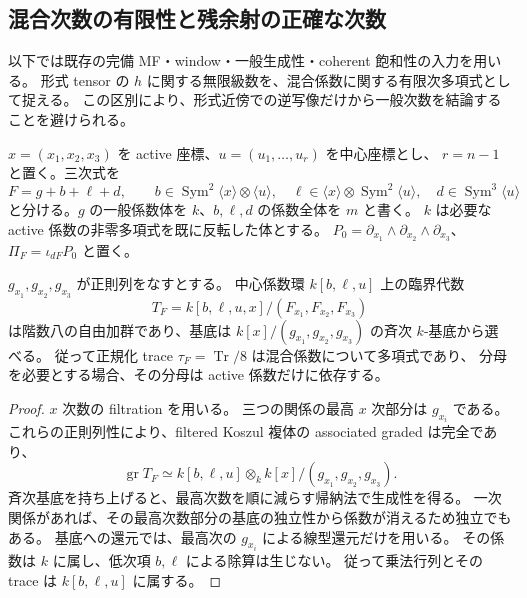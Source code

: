 \subsection{混合次数の有限性と残余射の正確な次数}

以下では既存の完備 MF・window・一般生成性・coherent 飽和性の入力を用いる。
形式 tensor の $h$ に関する無限級数を、混合係数に関する有限次多項式として捉える。
この区別により、形式近傍での逆写像だけから一般次数を結論することを避けられる。

$x=(x_1,x_2,x_3)$ を active 座標、$u=(u_1,\ldots,u_r)$ を中心座標とし、
$r=n-1$ と置く。三次式を
\[
 F=g+b+\ell+d,
 \qquad b\in\operatorname{Sym}^2\langle x\rangle\otimes\langle u\rangle,
 \quad\ell\in\langle x\rangle\otimes\operatorname{Sym}^2\langle u\rangle,
 \quad d\in\operatorname{Sym}^3\langle u\rangle
\]
と分ける。$g$ の一般係数体を $k$、$b,\ell,d$ の係数全体を $m$ と書く。
$k$ は必要な active 係数の非零多項式を既に反転した体とする。
$P_0=\partial_{x_1}\wedge\partial_{x_2}\wedge\partial_{x_3}$、
$\Pi_F=\iota_{dF}P_0$ と置く。

\begin{lemma}
\label{lem:nfm-trace-mixed-polynomial}
$g_{x_1},g_{x_2},g_{x_3}$ が正則列をなすとする。
中心係数環 $k[b,\ell,u]$ 上の臨界代数
\[
 T_F=k[b,\ell,u,x]/(F_{x_1},F_{x_2},F_{x_3})
\]
は階数八の自由加群であり、基底は
$k[x]/(g_{x_1},g_{x_2},g_{x_3})$ の斉次 $k$-基底から選べる。
従って正規化 trace $\tau_F=\operatorname{Tr}/8$ は混合係数について多項式であり、
分母を必要とする場合、その分母は active 係数だけに依存する。
\end{lemma}

\begin{proof}
$x$ 次数の filtration を用いる。
三つの関係の最高 $x$ 次部分は $g_{x_i}$ である。
これらの正則列性により、filtered Koszul 複体の associated graded は完全であり、
\[
 \operatorname{gr}T_F
 \simeq k[b,\ell,u]\otimes_k k[x]/(g_{x_1},g_{x_2},g_{x_3}).
\]
斉次基底を持ち上げると、最高次数を順に減らす帰納法で生成性を得る。
一次関係があれば、その最高次数部分の基底の独立性から係数が消えるため独立でもある。
基底への還元では、最高次の $g_{x_i}$ による線型還元だけを用いる。
その係数は $k$ に属し、低次項 $b,\ell$ による除算は生じない。
従って乗法行列とその trace は $k[b,\ell,u]$ に属する。
\end{proof}

